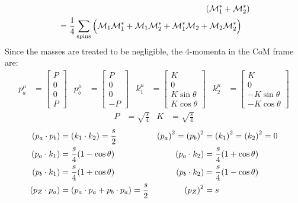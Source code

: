 \documentclass[12 pt,draft]{article}
\renewcommand{\b}[1]{\overline{#1}}
\begin{document}
\begin{problem}[ $\mu\b{\mu}\rightarrow f\b{f}$]
\begin{align}
		(\mathcal{M}_1^*+\mathcal{M}_2^*)
		\\
		\begin{split}
		&=\oo{4}\sum_\text{spins}
		\Big(
			\mathcal{M}_1\mathcal{M}_1^*
			+\mathcal{M}_1\mathcal{M}_2^*
			+\mathcal{M}_1^*\mathcal{M}_2
			+\mathcal{M}_2\mathcal{M}_2^*
			\Big)
		\end{split}
	\end{align}
	Since the masses are treated to be negligible, the 4-momenta in the CoM frame are:
	\begin{align}
		p_a^\mu&=
		\begin{bmatrix}
			P\\0\\0\\P
		\end{bmatrix}
		&
		p_b^\mu&=
		\begin{bmatrix}
			P\\0\\0\\-P
		\end{bmatrix}
		&
		k_1^\mu&=
		\begin{bmatrix}
			K\\0\\K\sin\theta\\K\cos\theta
		\end{bmatrix}
		&
		k_2^\mu&=
		\begin{bmatrix}
			K\\0\\-K\sin\theta\\-K\cos\theta
		\end{bmatrix}
	\end{align}
	\begin{align}
		P&=\sqrt{\frac{s}{4}}
		&
		K&=\sqrt{\frac{s}{4}}
	\end{align}
	\begin{align}
		\qty(p_a\cdot p_b)&=\qty(k_1\cdot k_2)=\frac{s}{2}
		&
		\qty(p_a)^2=\qty(p_b)^2&=\qty(k_1)^2=\qty(k_2)^2=0
		\\
		\qty(p_a\cdot k_1)&=\frac{s}{4}\qty(1-\cos\theta)
		&
		\qty(p_a\cdot k_2)&=\frac{s}{4}\qty(1+\cos\theta)
		\\
		\qty(p_b\cdot k_1)&=\frac{s}{4}\qty(1+\cos\theta)
		&
		\qty(p_b\cdot k_2)&=\frac{s}{4}\qty(1-\cos\theta)
		\\
		(p_Z\cdot p_a)&=\qty(p_a\cdot p_a+p_b\cdot p_a)=\frac{s}{2}
		&
		\qty(p_Z)^2&=s
	\end{align}


\end{problem}
\end{document}
